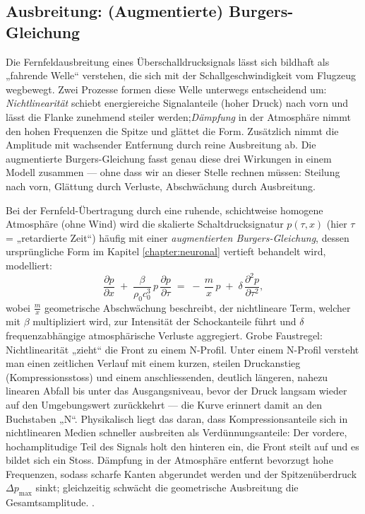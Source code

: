 \subsection{Ausbreitung: (Augmentierte) Burgers-Gleichung}
Die Fernfeldausbreitung eines Überschalldrucksignals lässt sich bildhaft als
„fahrende Welle“ verstehen, die sich mit der Schallgeschwindigkeit vom
Flugzeug wegbewegt.
Zwei Prozesse formen diese Welle unterwegs entscheidend um:
\emph{Nichtlinearität} schiebt energiereiche Signalanteile (hoher Druck) nach
vorn und lässt die Flanke zunehmend steiler werden;\emph{Dämpfung} in der
Atmosphäre nimmt den hohen Frequenzen die Spitze und glättet die Form.
Zusätzlich nimmt die Amplitude mit wachsender Entfernung durch reine Ausbreitung ab.
Die augmentierte Burgers-Gleichung fasst genau diese drei
Wirkungen in einem Modell zusammen — ohne dass wir an dieser Stelle rechnen
müssen: Steilung nach vorn, Glättung durch Verluste, Abschwächung durch
Ausbreitung.

Bei der Fernfeld-Übertragung durch eine ruhende, schichtweise homogene
Atmosphäre (ohne Wind) wird die skalierte Schaltdrucksignatur $p(\tau,x)$
(hier $\tau$ = „retardierte Zeit“) häufig mit einer \emph{augmentierten Burgers-Gleichung},
dessen ursprüngliche Form im Kapitel \ref{chapter:neuronal} vertieft
behandelt wird, modelliert:
\begin{equation}
  \frac{\partial p}{\partial x}
  \;+\;\frac{\beta}{\rho_0 c_0^{3}}\,p\,\frac{\partial p}{\partial \tau}
  \;=\;
  -\,\frac{m}{x}\,p
  \;+\;\delta\,\frac{\partial^2 p}{\partial \tau^2},
  \label{eq:aug-burgers}
\end{equation}
wobei $\frac{m}{x}$ geometrische Abschwächung beschreibt, der nichtlineare
Term, welcher mit $\beta$ multipliziert wird, zur Intensität der Schockanteile
führt und $\delta$ frequenzabhängige atmosphärische Verluste aggregiert.
Grobe Faustregel: Nichtlinearität „zieht“ die Front zu einem N-Profil.
Unter einem N-Profil versteht man einen zeitlichen Verlauf mit einem kurzen,
steilen Druckanstieg (Kompressionsstoss) und einem anschliessenden, deutlich
längeren, nahezu linearen Abfall bis unter das Ausgangsniveau, bevor der
Druck langsam wieder auf den Umgebungswert zurückkehrt — die Kurve erinnert
damit an den Buchstaben „N“.
Physikalisch liegt das daran, dass Kompressionsanteile sich in nichtlinearen Medien
schneller ausbreiten als Verdünnungsanteile: Der vordere, hochamplitudige Teil
des Signals holt den hinteren ein, die Front steilt auf und es bildet sich ein Stoss.
Dämpfung in der Atmosphäre entfernt bevorzugt hohe Frequenzen, sodass scharfe Kanten
abgerundet werden und der Spitzenüberdruck \(\Delta p_\mathrm{max}\) sinkt;
gleichzeitig schwächt die geometrische Ausbreitung die Gesamtsamplitude.
\cite{schall:rallabhandi2023,schall:rallabhandiAIAA2023,schall:burgersJASA}.

